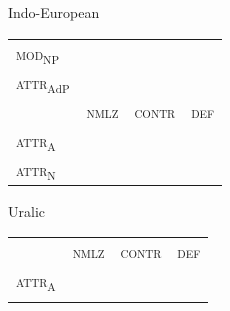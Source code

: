 {\begin{figure}
\parbox[b]{0.5\textwidth}{
\begin{center}Indo-European\\
\medskip
\begin{tabular}{| m{1.4cm} || m{.9cm} | m{1.1cm} | m{.7cm} |}
\cline{1-1}
\textsc{mod}$_{\text{NP}}$\\
\cline{1-1}
\textsc{attr}$_{\text{AdP}}$\\
\hline
 & \textsc{nmlz} & \textsc{contr} & \textsc{def}\\
\hline
\textsc{attr}$_{\text{A}}$\\
\cline{1-1}
\textsc{attr}$_{\text{N}}$\\
\cline{1-1}
\end{tabular}
\end{center}
}
\parbox[b]{0.5\textwidth}{
\begin{center}Uralic\\
\medskip
\begin{tabular}{| m{1.4cm} || m{.9cm} | m{1.1cm} | m{.7cm} |}
\cline{1-1}
\\
\cline{1-1}
\\
\hline
 & \textsc{nmlz} & \textsc{contr} & \textsc{def}\\
\hline
\textsc{attr}$_{\text{A}}$\\
\cline{1-1}
\\
\cline{1-1}
\end{tabular}
\end{center}
}


\end{figure}}
